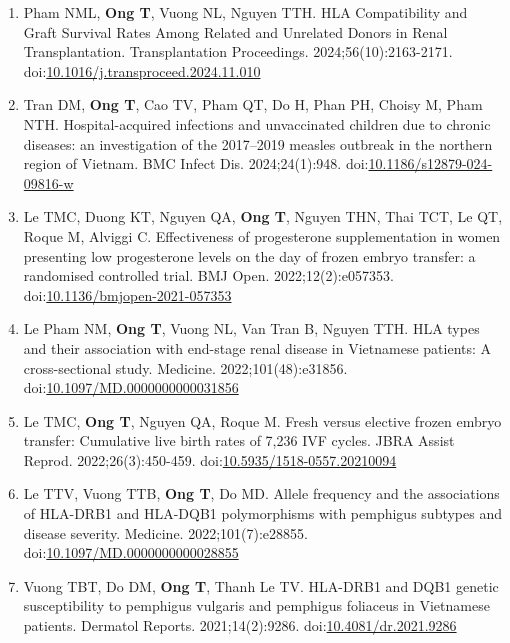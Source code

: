 \documentclass[
  12pt,
  a4paper,
]{article}
\providecommand{\tightlist}{%
  \setlength{\itemsep}{0pt}\setlength{\parskip}{0pt}}\usepackage{longtable,booktabs,array}
\begin{document}
\begin{enumerate}
\def\labelenumi{\arabic{enumi}.}
\tightlist
\item
  Pham NML, \textbf{Ong T}, Vuong NL, Nguyen TTH. HLA Compatibility and
  Graft Survival Rates Among Related and Unrelated Donors in Renal
  Transplantation. Transplantation Proceedings. 2024;56(10):2163-2171.
  doi:\href{https://doi.org/10.1016/j.transproceed.2024.11.010}{10.1016/j.transproceed.2024.11.010}
\item
  Tran DM, \textbf{Ong T}, Cao TV, Pham QT, Do H, Phan PH, Choisy M,
  Pham NTH. Hospital-acquired infections and unvaccinated children due
  to chronic diseases: an investigation of the 2017--2019 measles
  outbreak in the northern region of Vietnam. BMC Infect Dis.
  2024;24(1):948.
  doi:\href{https://doi.org/10.1186/s12879-024-09816-w}{10.1186/s12879-024-09816-w}
\item
  Le TMC, Duong KT, Nguyen QA, \textbf{Ong T}, Nguyen THN, Thai TCT, Le
  QT, Roque M, Alviggi C. Effectiveness of progesterone supplementation
  in women presenting low progesterone levels on the day of frozen
  embryo transfer: a randomised controlled trial. BMJ Open.
  2022;12(2):e057353.
  doi:\href{https://doi.org/10.1136/bmjopen-2021-057353}{10.1136/bmjopen-2021-057353}
\item
  Le Pham NM, \textbf{Ong T}, Vuong NL, Van Tran B, Nguyen TTH. HLA
  types and their association with end-stage renal disease in Vietnamese
  patients: A cross-sectional study. Medicine. 2022;101(48):e31856.
  doi:\href{https://doi.org/10.1097/MD.0000000000031856}{10.1097/MD.0000000000031856}
\item
  Le TMC, \textbf{Ong T}, Nguyen QA, Roque M. Fresh versus elective
  frozen embryo transfer: Cumulative live birth rates of 7,236 IVF
  cycles. JBRA Assist Reprod. 2022;26(3):450-459.
  doi:\href{https://doi.org/10.5935/1518-0557.20210094}{10.5935/1518-0557.20210094}
\item
  Le TTV, Vuong TTB, \textbf{Ong T}, Do MD. Allele frequency and the
  associations of HLA-DRB1 and HLA-DQB1 polymorphisms with pemphigus
  subtypes and disease severity. Medicine. 2022;101(7):e28855.
  doi:\href{https://doi.org/10.1097/MD.0000000000028855}{10.1097/MD.0000000000028855}
\item
  Vuong TBT, Do DM, \textbf{Ong T}, Thanh Le TV. HLA-DRB1 and DQB1
  genetic susceptibility to pemphigus vulgaris and pemphigus foliaceus
  in Vietnamese patients. Dermatol Reports. 2021;14(2):9286.
  doi:\href{https://doi.org/10.4081/dr.2021.9286}{10.4081/dr.2021.9286}

\end{enumerate}
\end{document}
